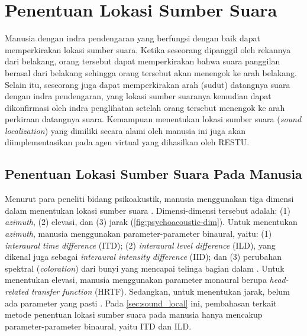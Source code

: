 \section{Penentuan Lokasi Sumber Suara}
\label{sec:sound_local}

Manusia dengan indra pendengaran yang berfungsi dengan baik dapat memperkirakan lokasi sumber suara. Ketika seseorang dipanggil oleh rekannya dari belakang, orang tersebut dapat memperkirakan bahwa suara panggilan berasal dari belakang sehingga orang tersebut akan menengok ke arah belakang. Selain itu, seseorang juga dapat memperkirakan arah (sudut) datangnya suara dengan indra pendengaran, yang lokasi sumber suaranya kemudian dapat dikonfirmasi oleh indra penglihatan setelah orang tersebut menengok ke arah perkiraan datangnya suara. Kemampuan menentukan lokasi sumber suara (\textit{sound localization}) yang dimiliki secara alami oleh manusia ini juga akan diimplementasikan pada agen virtual yang dihasilkan oleh RESTU.


\subsection{Penentuan Lokasi Sumber Suara Pada Manusia}
\label{subsec:human_sound_local}

Menurut para peneliti bidang psikoakustik, manusia menggunakan tiga dimensi dalam menentukan lokasi sumber suara \cite{goldstein2010}. Dimensi-dimensi tersebut adalah: (1) \textit{azimuth}, (2) elevasi, dan (3) jarak (\autoref{fig:psychoacoustic-dim}). Untuk menentukan \textit{azimuth}, manusia menggunakan parameter-parameter binaural, yaitu: (1) \textit{interaural time difference} (ITD); (2) \textit{interaural level difference} (ILD), yang dikenal juga sebagai \textit{interaural intensity difference} (IID); dan (3) perubahan spektral (\textit{coloration}) dari bunyi yang mencapai telinga bagian dalam \cite{goldstein2010, gelfand2010, kollmeier2008}. Untuk menentukan elevasi, manusia menggunakan parameter monaural berupa \textit{head-related transfer function} (HRTF). Sedangkan, untuk menentukan jarak, belum ada parameter yang pasti \cite{goldstein2010, gelfand2010}. Pada \autoref{sec:sound_local} ini, pembahasan terkait metode penentuan lokasi sumber suara pada manusia hanya mencakup parameter-parameter binaural, yaitu ITD dan ILD.

